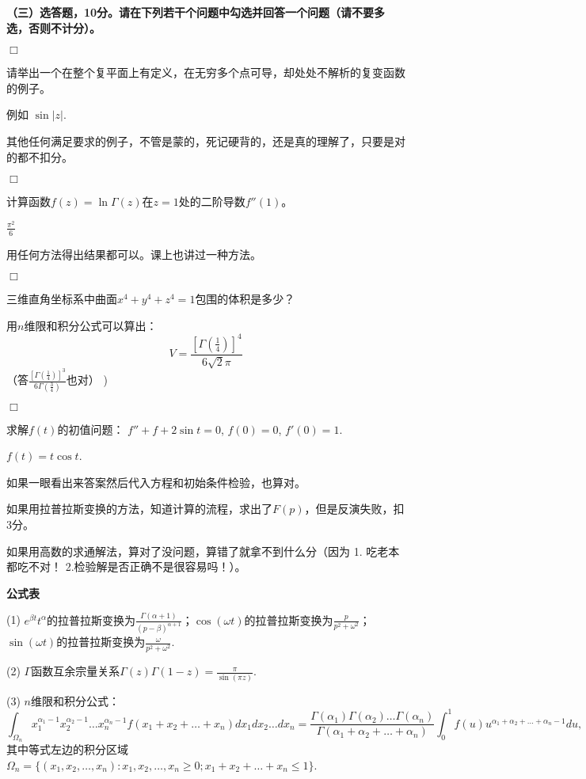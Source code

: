 \documentclass[CJK]{article}
\begin{document}
{\bf \noindent（三）选答题，10分。请在下列若干个问题中勾选并回答一个问题（请不要多选，否则不计分）。}

\bitem
\item[{\bf $\Box$}]{请举出一个在整个复平面上有定义，在无穷多个点可导，却处处不解析的复变函数的例子。

{\blue 例如 $\sin |z|$.

其他任何满足要求的例子，不管是蒙的，死记硬背的，还是真的理解了，只要是对的都不扣分。
}
}
\item[{\bf $\Box$}]{计算函数$f(z) = \ln \Gamma(z)$在$z=1$处的二阶导数$f''(1)$。

{\blue $\frac{\pi^2}{6}$

用任何方法得出结果都可以。课上也讲过一种方法。
}


}
\item[{\bf $\Box$}]{三维直角坐标系中曲面$x^4+y^4+z^4=1$包围的体积是多少？

{\blue
用$n$维限和积分公式可以算出：
$$V=\frac{\left[\Gamma\left(\frac{1}{4}\right)\right]^4}{6\sqrt{2}\pi}$$
（答$\frac{\left[\Gamma\left(\frac{1}{4}\right)\right]^3}{6\Gamma\left(\frac{3}{4}\right)}$也对）
)
}
}
\item[{\bf $\Box$}]{求解$f(t)$的初值问题： $f'' + f + 2\sin t = 0$, $f(0)= 0$,  $f'(0) = 1$.

{\blue $f(t)=t\cos t$.

如果一眼看出来答案然后代入方程和初始条件检验，也算对。

如果用拉普拉斯变换的方法，知道计算的流程，求出了$F(p)$，但是反演失败，扣3分。

如果用高数的求通解法，算对了没问题，算错了就拿不到什么分（因为 1. 吃老本都吃不对！ 2.检验解是否正确不是很容易吗！）。
}
}
  \eitem



{\noindent \bf 公式表}
\bitem
  \item[(1)]{$e^{\beta t} t^\alpha$的拉普拉斯变换为$\frac{\Gamma(\alpha+1)}{(p-\beta)^{\alpha+1}}$；$\cos(\omega t)$的拉普拉斯变换为$\frac{p}{p^2+\omega^2}$；$\sin(\omega t)$的拉普拉斯变换为$\frac{\omega}{p^2+\omega^2}$.}
  \item[(2)]{$\Gamma$函数互余宗量关系$\Gamma(z)\Gamma(1-z) = \frac{\pi}{\sin{(\pi z)}}.$}
  \item[(3)]{$n$维限和积分公式：
 $$\int_{\Omega_n} x_1^{\alpha_1-1}x_2^{\alpha_2-1}\ldots x_n^{\alpha_n-1} f(x_1+x_2+\ldots+x_n)dx_1dx_2\ldots dx_n= \frac{\Gamma(\alpha_1)\Gamma(\alpha_2)\ldots \Gamma(\alpha_n)}{\Gamma(\alpha_1+\alpha_2+\ldots + \alpha_n)}\int_0^1f(u)u^{\alpha_1+\alpha_2+\ldots + \alpha_n-1} du ,$$
  其中等式左边的积分区域$\Omega_n = \{(x_1,x_2,\ldots,x_n): x_1,x_2,\ldots, x_n\ge 0; x_1+x_2+\ldots+x_n\le 1 \}$.
  }
    \eitem
\ech
\end{document}
